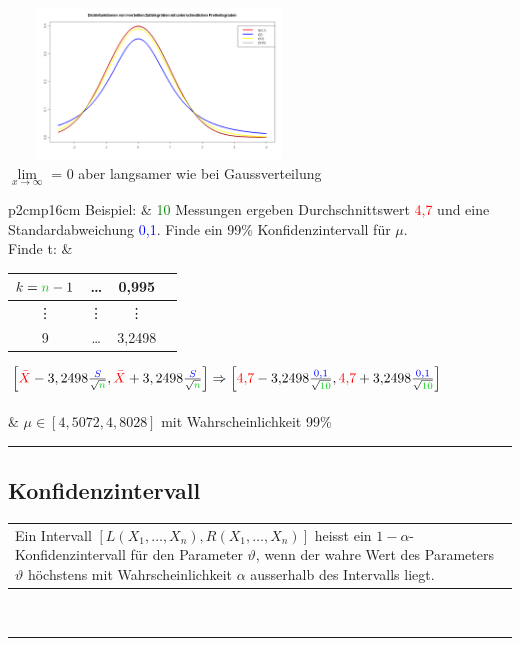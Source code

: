 	\begin{minipage}{10cm}
   		\includegraphics[width=8cm,height=4cm]{./bilder/T-Verteilung.png}\\
		$\lim\limits_{x\rightarrow \infty}$ = 0 aber langsamer wie bei
		Gaussverteilung 
    \end{minipage}

		\begin{tabular}{p{2cm}p{16cm}}
        Beispiel: & \textcolor{green}{10} Messungen ergeben Durchschnittswert
        \textcolor{red}{4{,}7} und eine Standardabweichung \textcolor{blue}{0{,}1}.
        Finde ein 99\%  Konfidenzintervall für $\mu$.\\
        
         Finde t: & \begin{tabular}{| c | c | c | c |}
                   \hline
                   $k=\textcolor{green}{n}-1$ & \ldots & 0{,}995\\
                   \hline
                   \vdots & \vdots & \vdots \\
                   \hline
                   9 & \ldots & 3{,}2498\\
                   \hline
                   \end{tabular}
        
       		 $\left[\textcolor{red}{\bar{X}}-3,2498\frac{\textcolor{blue}{S}}{\sqrt{\textcolor{green}{n}}},
		\textcolor{red}{\bar{X}}+3,2498\frac{\textcolor{blue}{S}}{\sqrt{\textcolor{green}{n}}}\right]
		\Rightarrow 
		\left[{\color{red}4{,}7}-3{,}2498\frac{\textcolor{blue}{0{,}1}}{\sqrt{\textcolor{green}{10}}},
		\textcolor{red}{4{,}7}+3{,}2498\frac{\textcolor{blue}{0{,}1}}{\sqrt{\textcolor{green}{10}}}\right]$\\ \\
		& $\mu\in \left[4{,}5072, 4{,}8028\right]$ mit Wahrscheinlichkeit 99\%
        \end{tabular}
\hrule

	\subsection{Konfidenzintervall }
	\begin{tabular}{p{18cm}}
     Ein Intervall $[L(X_1,\ldots,X_n),R(X_1,\ldots,X_n)]$ heisst ein
     $1-\alpha$- Konfidenzintervall für den Parameter $\vartheta$, wenn der wahre
     Wert des Parameters $\vartheta$ höchstens mit Wahrscheinlichkeit $\alpha$
     ausserhalb des Intervalls liegt.
    \end{tabular}\\
\hrule